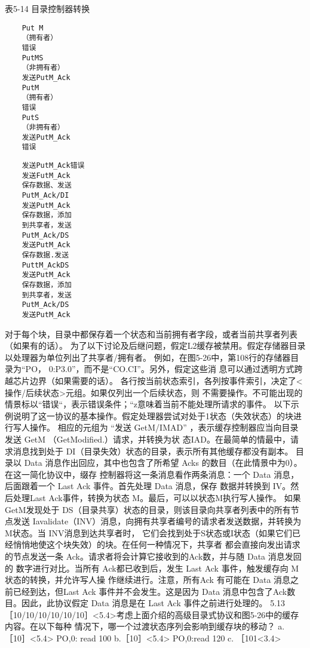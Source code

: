 表5-14 目录控制器转换
\begin{verbatim}
    Put M
    （拥有者）
    错误
    PutMS
    （非拥有者）
    发送PutM_Ack
    PutM
    （拥有者）
    错误
    PutS
    （非拥有者）
    发送PutM_Ack
    错误
\end{verbatim}
\begin{verbatim}
    发送PutM_Ack错误
    发送FutM_Ack
    保存数据、发送
    PutM_Ack/DI
    发送PutM_Ack
    保存数据，添加
    到共享者，发送
    PutM_Ack/DS
    发送PutM_Ack
    保存数据.发送
    PuttM_AckDS
    发送PutM_Ack
    保存数据，添加
    到共享者，发送
    PutM_Ack/DS
    发送PutM_Ack
\end{verbatim}
对于每个块，目录中都保存着一个状态和当前拥有者字段，或者当前共享者列表（如果有的话）。
为了以下讨论及后继问题，假定L2缓存被禁用。假定存储器目录以处理器为单位列出了共享者/拥有者。
例如，在图5-26中，第108行的存储器目录为“PO， 0:P3.0”，而不是“CO.CI”。另外，假定这些消
息可以通过透明方式跨越芯片边界（如果需要的话）。
各行按当前状态索引，各列按事件索引，决定了<操作/后续状态>元组。如果仅列出一个后续状态，则
不需要操作。不可能出现的情景标以“错误“，表示错误条件；“z意味着当前不能处理所请求的事件。
以下示例说明了这一协议的基本操作。假定处理器尝试对处于1状态（失效状态）的块进行写人操作。
相应的元组为 “发送 GetM/IMAD”
，表示缓存控制器应当向目录发送 GetM （GetModified.）请求，并转换为状
态IAD。在最简单的情最中，请求消息找到处于 DI（目录失效）状态的目录，表示所有其他缓存都没有副本。
目录以 Data 消息作出回应，其中也包含了所希望 Acks 的数目（在此情景中为0）。在这一简化协议中，缀存
控制器将这一条消息看作两条消息：一个 Data 消息，后面跟着一个 Last Ack 事件。首先处理 Data 消息，保存
数据并转换到 IV。然后处理Last Ack事件，转换为状态 M。最后，可以以状态M执行写人操作。
如果 GetM发现处于 DS（目录共享）状态的目录，则该目录向共享者列表中的所有节点发送
Iavalidate（INV）消息，向拥有共享者编号的请求者发送数据，并转换为M状态。当 INV消息到达共享者时，
它们会找到处于S状态或I状态（如果它们已经悄悄地使这个块失效）的块。在任何一种情况下，共享者
都会直接向发出请求的节点发送一条 Ack。请求者将会计算它接收到的Ack数，并与随 Data 消息发回的
数字进行对比。当所有 Ack都已收到后，发生 Last Ack 事件，触发缓存向 M状态的转换，并允许写人操
作继续进行。注意，所有Ack 有可能在 Data 消息之前已经到达，但Last Ack 事件并不会发生。这是因为
Data 消息中包含了Ack数目。因此，此协议假定 Data 消息是在 Last Ack 事件之前进行处理的。
5.13 ［10/10/10/10/10/10］<5.4>考虑上面介绍的高级目录式协议和图5-26中的缓存内容。在以下每种
情况下，哪一个过渡状态序列会影响到缓存块的移动？
a. ［10］<5.4>
PO,0: read 100
b.［10］<5.4>
PO,0:read 120
c. ［101<3.4>
